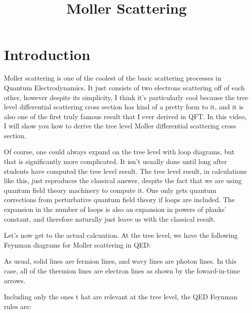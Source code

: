 \documentclass[a4]{article}
\begin{document}
    \title{Moller Scattering}
    \maketitle

    \section*{Introduction}

    Moller scattering is one of the coolest of the basic scattering processes in Quantum Electrodynamics. It just consists of two electrons scattering off of each other, however despite its simplicity,
    I think it's particularly cool because the tree level differential scattering cross section has kind of a pretty form to it, and it is also one of the first truly famous result that I ever derived
    in QFT. In this video, I will show you how to derive the tree level Moller differential scattering cross section.

    Of course, one could always expand on the tree level with loop diagrams, but that is significantly more complicated. It isn't usually done until long after students have computed the tree level result.
    The tree level result, in calculations like this, just reproduces the classical answer, despite the fact that we are using quantum field theory machinery to compute it. One only gets quantum corrections
    from perturbative quantum field theory if loops are included. The expansion in the number of loops is also an expansion in powers of planks' constant, and therefore naturally just leave us with the
    classical result.

    Let's now get to the actual calcuation. At the tree level, we have the following Feynman diagrams for Moller scattering in QED:


    As usual, solid lines are fermion lines, and wavy lines are photon lines. In this case, all of the thermion lines are electron lines as shown by the foward-in-time arrows.

    Including only the ones t hat are relevant at the tree level, the QED Feynman rules are:
\end{document}
